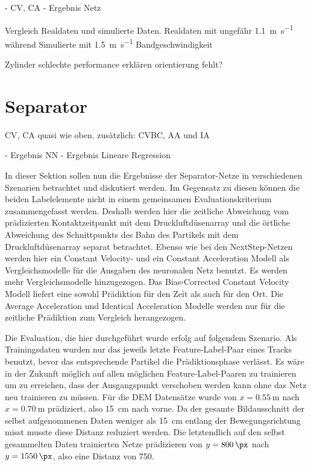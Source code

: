 \color{blue}
- CV, CA
- Ergebnis Netz

Vergleich Realdaten und simulierte Daten.
Realdaten mit ungefähr \SI{1.1}{\meter\per\second} während Simulierte mit \SI{1.5}{\metre\per\second} Bandgeschwindigkeit 

Zylinder schlechte performance erklären \textrightarrow orientierung fehlt?
\color{black}

\section{Separator}

\color{blue}
CV, CA quasi wie oben.
zusätzlich: CVBC, AA und IA

- Ergebnis NN
- Ergebnis Lineare Regression
\color{black}



In dieser Sektion sollen nun die Ergebnisse der Separator-Netze in verschiedenen Szenarien betrachtet und diskutiert werden.
Im Gegensatz zu diesen können die beiden Labelelemente nicht in einem gemeinsamen Evaluationskriterium zusammengefasst werden.
Deshalb werden hier die zeitliche Abweichung vom prädizierten Kontaktzeitpunkt mit dem Druckluftdüsenarray und die örtliche Abweichung des Schnittpunkts des Bahn des Partikels mit dem Druckluftdüsenarray separat betrachtet.
Ebenso wie bei den NextStep-Netzen werden hier ein Constant Velocity- und ein Constant Acceleration Modell als Vergleichsmodelle für die Ausgaben des neuronalen Netz benutzt.
Es werden mehr Vergleichsmodelle hinzugezogen. 
Das Bias-Corrected Constant Velocity Modell liefert eine sowohl Prädiktion für den Zeit als auch für den Ort.
Die Average Acceleration und Identical Acceleration Modelle werden nur für die zeitliche Prädiktion zum Vergleich herangezogen.

Die Evaluation, die hier durchgeführt wurde erfolg auf folgendem Szenario.
Als Trainingsdaten wurden nur das jeweils letzte Feature-Label-Paar eines Tracks benutzt, bevor das entsprechende Partikel die Prädiktionsphase verlässt.
Es wäre in der Zukunft möglich auf allen möglichen Feature-Label-Paaren zu trainieren um zu erreichen, dass der Ausgangspunkt verschoben werden kann ohne das Netz neu trainieren zu müssen.
Für die DEM Datensätze wurde von \(x = \SI{0.55}{\meter}\) nach \(x = \SI{0.70}{\meter}\) prädiziert, also \SI{15}{\centi\meter} nach vorne.
Da der gesamte Bildausschnitt der selbst aufgenommenen Daten weniger als \SI{15}{\centi\meter} entlang der Bewegungsrichtung misst musste diese Distanz reduziert werden.
Die letztendlich auf den selbst gesammelten Daten trainierten Netze prädizieren von \(y = \SI{800}{\px}\) nach \(y = \SI{1550}{\px}\), also eine Distanz von \SI{750}{\px}.


